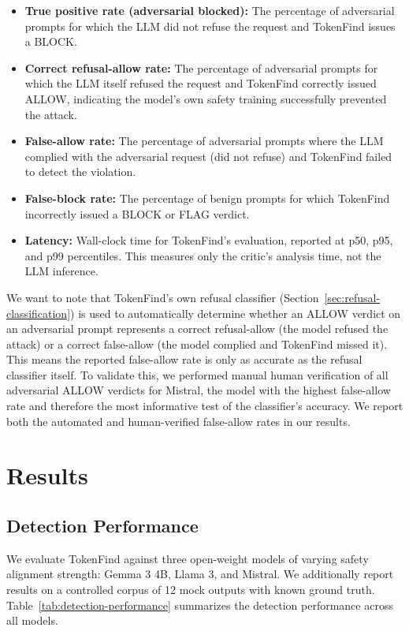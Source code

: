 \documentclass[11pt]{article}
\begin{document}
\begin{itemize}
\item \textbf{True positive rate (adversarial blocked):} The percentage of adversarial prompts for
which the LLM did not refuse the request and TokenFind issues a BLOCK.
\item \textbf{Correct refusal-allow rate:} The percentage of adversarial prompts for which the LLM
itself refused the request and TokenFind correctly issued ALLOW, indicating the model's
own safety training successfully prevented the attack.
\item \textbf{False-allow rate:} The percentage of adversarial prompts where the LLM complied with the
adversarial request (did not refuse) and TokenFind failed to detect the violation.
\item \textbf{False-block rate:} The percentage of benign prompts for which TokenFind incorrectly issued
a BLOCK or FLAG verdict.
\item \textbf{Latency:} Wall-clock time for TokenFind's evaluation, reported at p50, p95, and p99 percentiles. This measures only the critic's analysis time, not the LLM inference.
\end{itemize}

We want to note that TokenFind's own refusal classifier (Section~\ref{sec:refusal-classification}) is used to automatically
determine whether an ALLOW verdict on an adversarial prompt represents a correct refusal-allow
(the model refused the attack) or a correct false-allow (the model complied and TokenFind missed
it). This means the reported false-allow rate is only as accurate as the refusal classifier itself.
To validate this, we performed manual human verification of all adversarial ALLOW verdicts for
Mistral, the model with the highest false-allow rate and therefore the most informative test of the
classifier's accuracy. We report both the automated and human-verified false-allow rates in our
results.

\section{Results}
\label{sec:results}

\subsection{Detection Performance}
\label{sec:detection-performance}

We evaluate TokenFind against three open-weight models of varying safety alignment strength:
Gemma 3 4B, Llama 3, and Mistral. We additionally report results on a controlled corpus of 12
mock outputs with known ground truth. Table~\ref{tab:detection-performance} summarizes the detection performance across
all models.
\end{document}
